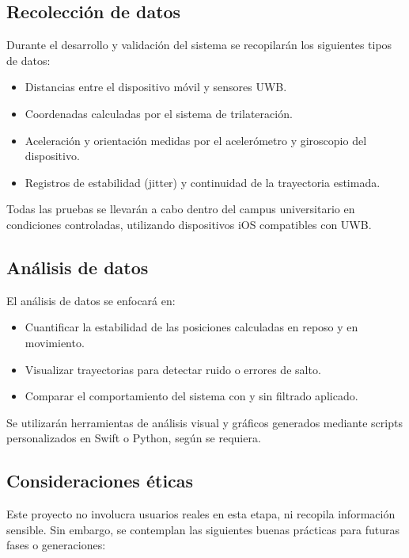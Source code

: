 \documentclass{article}
\begin{document}
\subsection{Recolección de datos}

Durante el desarrollo y validación del sistema se recopilarán los siguientes tipos de datos:

\begin{itemize}
    \item Distancias entre el dispositivo móvil y sensores UWB.
    \item Coordenadas calculadas por el sistema de trilateración.
    \item Aceleración y orientación medidas por el acelerómetro y giroscopio del dispositivo.
    \item Registros de estabilidad (jitter) y continuidad de la trayectoria estimada.
\end{itemize}

Todas las pruebas se llevarán a cabo dentro del campus universitario en condiciones controladas, utilizando dispositivos iOS compatibles con UWB.

\subsection{Análisis de datos}

El análisis de datos se enfocará en:

\begin{itemize}
    \item Cuantificar la estabilidad de las posiciones calculadas en reposo y en movimiento.
    \item Visualizar trayectorias para detectar ruido o errores de salto.
    \item Comparar el comportamiento del sistema con y sin filtrado aplicado.
\end{itemize}

Se utilizarán herramientas de análisis visual y gráficos generados mediante scripts personalizados en Swift o Python, según se requiera.

\subsection{Consideraciones éticas}

Este proyecto no involucra usuarios reales en esta etapa, ni recopila información sensible. Sin embargo, se contemplan las siguientes buenas prácticas para futuras fases o generaciones:
\end{document}
